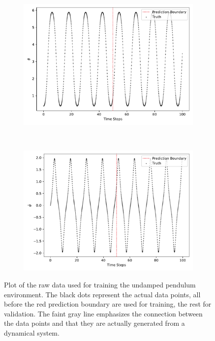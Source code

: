 		\begin{figure}
			\centering
			\begin{subfigure}{0.5\linewidth}
				\centering
				\includegraphics[width=\linewidth]{figures/experiments/environments/observations-pendulum-N0-D0.pdf}
			\end{subfigure}%
			~
			\begin{subfigure}{0.5\linewidth}
				\centering
				\includegraphics[width=\linewidth]{figures/experiments/environments/observations-pendulum-N0-D1.pdf}
			\end{subfigure}
			\caption{Plot of the raw data used for training the undamped pendulum environment. The black dots represent the actual data points, all before the red prediction boundary are used for training, the rest for validation. The faint gray line emphasizes the connection between the data points and that they are actually generated from a dynamical system.}
			\label{fig:envPendulum}
		\end{figure}
